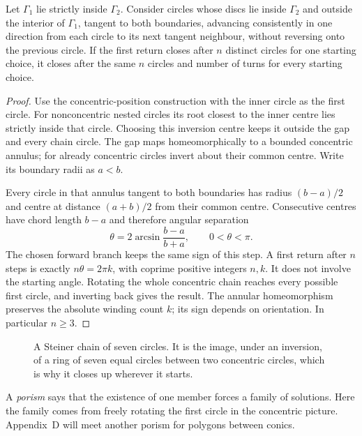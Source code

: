 \begin{theorem}\label{geometry:thm:steiner}
Let $\Gamma_1$ lie strictly inside $\Gamma_2$. Consider circles whose discs lie inside $\Gamma_2$ and outside the interior of $\Gamma_1$, tangent to both boundaries, advancing consistently in one direction from each circle to its next tangent neighbour, without reversing onto the previous circle. If the first return closes after $n$ distinct circles for one starting choice, it closes after the same $n$ circles and number of turns for every starting choice.
\end{theorem}
\begin{proof}
Use the concentric-position construction with the inner circle as the first circle. For nonconcentric nested circles its root closest to the inner centre lies strictly inside that circle. Choosing this inversion centre keeps it outside the gap and every chain circle. The gap maps homeomorphically to a bounded concentric annulus; for already concentric circles invert about their common centre. Write its boundary radii as $a<b$.

Every circle in that annulus tangent to both boundaries has radius $(b-a)/2$ and centre at distance $(a+b)/2$ from their common centre. Consecutive centres have chord length $b-a$ and therefore angular separation
\[
\theta=2\arcsin\frac{b-a}{b+a},\qquad 0<\theta<\pi.
\]
The chosen forward branch keeps the same sign of this step. A first return after $n$ steps is exactly $n\theta=2\pi k$, with coprime positive integers $n,k$. It does not involve the starting angle. Rotating the whole concentric chain reaches every possible first circle, and inverting back gives the result. The annular homeomorphism preserves the absolute winding count $k$; its sign depends on orientation. In particular $n\ge3$.
\end{proof}

\begin{figure}[ht]
\centering
{}
\caption{A Steiner chain of seven circles. It is the image, under an inversion, of a ring of seven equal circles between two concentric
circles, which is why it closes up wherever it starts.}
\label{geometry:fig:steiner}
\end{figure}

A \emph{porism} says that the existence of one member forces a family of solutions. Here the family comes from freely rotating the first circle in the concentric picture. Appendix~D will meet another porism for polygons between conics.

